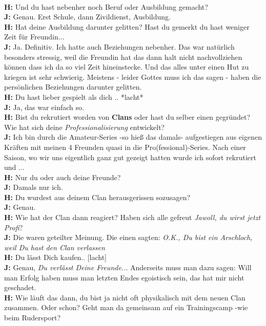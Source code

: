 \\ \textbf{H:} Und du hast nebenher noch Beruf oder Ausbildung gemacht?
\\ \textbf{J:} Genau. Erst Schule, dann Zivildienst, Ausbildung.
\\ \textbf{H:} Hat deine Ausbildung darunter gelitten? Hast du gemerkt du hast weniger Zeit für Freundin...
\\ \textbf{J:} Ja. Definitiv. Ich hatte auch Beziehungen nebenher. Das war natürlich besonders stressig, weil die Freundin hat das dann halt nicht nachvollziehen können dass ich da so viel Zeit hineinstecke. Und das alles unter einen Hut zu kriegen ist sehr schwierig. Meistens - leider Gottes muss ich das sagen - haben die persönlichen Beziehungen darunter gelitten.
\\ \textbf{H:} Du hast lieber gespielt als dich .. *lacht*
\\ \textbf{J:} Ja, das war einfach so.
\\ \textbf{H:} Bist du rekrutiert worden von \textbf{Clans} oder hast du selber einen gegründet? Wie hat sich deine \textit{Professionalisierung} entwickelt?
\\ \textbf{J:} Ich bin durch die Amateur-Series -so hieß das damals- aufgestiegen aus eigenen Kräften mit meinen 4 Freunden quasi in die Pro(fessional)-Series. Nach einer Saison, wo wir uns eigentlich ganz gut gezeigt hatten wurde ich sofort rekrutiert und ...
\\ \textbf{H:} Nur du oder auch deine Freunde?
\\ \textbf{J:} Damals nur ich.
\\ \textbf{H:} Du wurdest aus deinem Clan herausgerissen sozusagen?
\\ \textbf{J:} Genau.
\\ \textbf{H:} Wie hat der Clan dann reagiert? Haben sich alle gefreut \textit{Jawoll, du wirst jetzt Profi}?
\\ \textbf{J:} Die waren geteilter Meinung. Die einen sagten: \textit{O.K., Du bist ein Arschloch, weil Du hast den Clan verlassen}
\\ \textbf{H:} Du lässt Dich kaufen.. [lacht]
\\ \textbf{J:} Genau, \textit{Du verlässt Deine Freunde..}. Anderseits muss man dazu sagen: Will man Erfolg haben muss man letzten Endes egoistisch sein, das hat mir nicht geschadet.
\\ \textbf{H:} Wie läuft das dann, du bist ja nicht oft physikalisch mit dem neuen Clan zusammen. Oder schon? Geht man da gemeinsam auf ein Trainingscamp -wie beim Rudersport?
